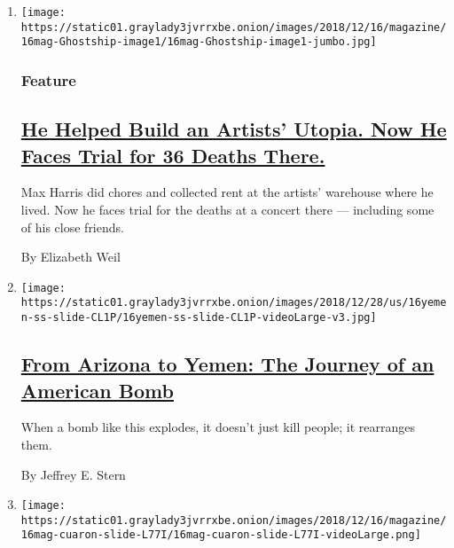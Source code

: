 \begin{enumerate}
\def\labelenumi{\arabic{enumi}.}
\item
  \texttt{[image: https://static01.graylady3jvrrxbe.onion/images/2018/12/16/magazine/16mag-Ghostship-image1/16mag-Ghostship-image1-jumbo.jpg]}

  \hypertarget{feature}{%
  \subsubsection{Feature}\label{feature}}

  \hypertarget{he-helped-build-an-artists-utopia-now-he-faces-trial-for-36-deaths-there}{%
  \subsection{\texorpdfstring{\href{/2018/12/12/magazine/oakland-warehouse-fire-ghost-ship.html}{He
  Helped Build an Artists' Utopia. Now He Faces Trial for 36 Deaths
  There.}}{He Helped Build an Artists' Utopia. Now He Faces Trial for 36 Deaths There.}}\label{he-helped-build-an-artists-utopia-now-he-faces-trial-for-36-deaths-there}}

  Max Harris did chores and collected rent at the artists' warehouse
  where he lived. Now he faces trial for the deaths at a concert there
  --- including some of his close friends.

  By Elizabeth Weil
\item
  \texttt{[image: https://static01.graylady3jvrrxbe.onion/images/2018/12/28/us/16yemen-ss-slide-CL1P/16yemen-ss-slide-CL1P-videoLarge-v3.jpg]}

  \hypertarget{from-arizona-to-yemen-the-journey-of-an-american-bomb}{%
  \subsection{\texorpdfstring{\href{/2018/12/11/magazine/war-yemen-american-bomb-strike.html}{From
  Arizona to Yemen: The Journey of an American
  Bomb}}{From Arizona to Yemen: The Journey of an American Bomb}}\label{from-arizona-to-yemen-the-journey-of-an-american-bomb}}

  When a bomb like this explodes, it doesn't just kill people; it
  rearranges them.

  By Jeffrey E. Stern
\item
  \texttt{[image: https://static01.graylady3jvrrxbe.onion/images/2018/12/16/magazine/16mag-cuaron-slide-L77I/16mag-cuaron-slide-L77I-videoLarge.png]}


\end{enumerate}
